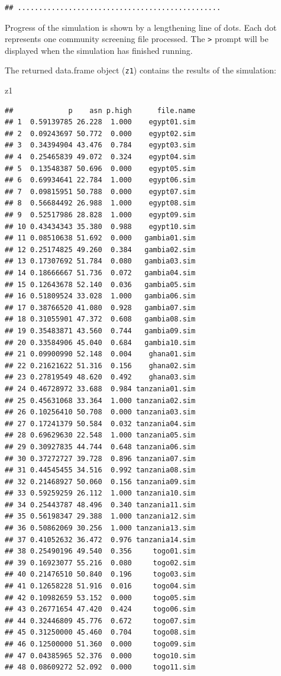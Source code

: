 \documentclass[12pt,a4paper]{book}
\newenvironment{Shaded}{\begin{snugshade}}{\end{snugshade}}
\newcommand{\NormalTok}[1]{#1}
\theoremstyle{definition}
\theoremstyle{definition}
\theoremstyle{definition}
\theoremstyle{remark}
\begin{document}
\begin{verbatim}
## ................................................
\end{verbatim}

Progress of the simulation is shown by a lengthening line of dots. Each
dot represents one community screening file processed. The
\texttt{\textgreater{}} prompt will be displayed when the simulation has
finished running.

The returned data.frame object (\texttt{z1}) contains the results of the
simulation:

\begin{Shaded}
\begin{Highlighting}[]
\NormalTok{z1}
\end{Highlighting}
\end{Shaded}

\begin{verbatim}
##             p    asn p.high      file.name
## 1  0.59139785 26.228  1.000    egypt01.sim
## 2  0.09243697 50.772  0.000    egypt02.sim
## 3  0.34394904 43.476  0.784    egypt03.sim
## 4  0.25465839 49.072  0.324    egypt04.sim
## 5  0.13548387 50.696  0.000    egypt05.sim
## 6  0.69934641 22.784  1.000    egypt06.sim
## 7  0.09815951 50.788  0.000    egypt07.sim
## 8  0.56684492 26.988  1.000    egypt08.sim
## 9  0.52517986 28.828  1.000    egypt09.sim
## 10 0.43434343 35.380  0.988    egypt10.sim
## 11 0.08510638 51.692  0.000   gambia01.sim
## 12 0.25174825 49.260  0.384   gambia02.sim
## 13 0.17307692 51.784  0.080   gambia03.sim
## 14 0.18666667 51.736  0.072   gambia04.sim
## 15 0.12643678 52.140  0.036   gambia05.sim
## 16 0.51809524 33.028  1.000   gambia06.sim
## 17 0.38766520 41.080  0.928   gambia07.sim
## 18 0.31055901 47.372  0.608   gambia08.sim
## 19 0.35483871 43.560  0.744   gambia09.sim
## 20 0.33584906 45.040  0.684   gambia10.sim
## 21 0.09900990 52.148  0.004    ghana01.sim
## 22 0.21621622 51.316  0.156    ghana02.sim
## 23 0.27819549 48.620  0.492    ghana03.sim
## 24 0.46728972 33.688  0.984 tanzania01.sim
## 25 0.45631068 33.364  1.000 tanzania02.sim
## 26 0.10256410 50.708  0.000 tanzania03.sim
## 27 0.17241379 50.584  0.032 tanzania04.sim
## 28 0.69629630 22.548  1.000 tanzania05.sim
## 29 0.30927835 44.744  0.648 tanzania06.sim
## 30 0.37272727 39.728  0.896 tanzania07.sim
## 31 0.44545455 34.516  0.992 tanzania08.sim
## 32 0.21468927 50.060  0.156 tanzania09.sim
## 33 0.59259259 26.112  1.000 tanzania10.sim
## 34 0.25443787 48.496  0.340 tanzania11.sim
## 35 0.56198347 29.388  1.000 tanzania12.sim
## 36 0.50862069 30.256  1.000 tanzania13.sim
## 37 0.41052632 36.472  0.976 tanzania14.sim
## 38 0.25490196 49.540  0.356     togo01.sim
## 39 0.16923077 55.216  0.080     togo02.sim
## 40 0.21476510 50.840  0.196     togo03.sim
## 41 0.12658228 51.916  0.016     togo04.sim
## 42 0.10982659 53.152  0.000     togo05.sim
## 43 0.26771654 47.420  0.424     togo06.sim
## 44 0.32446809 45.776  0.672     togo07.sim
## 45 0.31250000 45.460  0.704     togo08.sim
## 46 0.12500000 51.360  0.000     togo09.sim
## 47 0.04385965 52.376  0.000     togo10.sim
## 48 0.08609272 52.092  0.000     togo11.sim
\end{verbatim}
\end{document}

